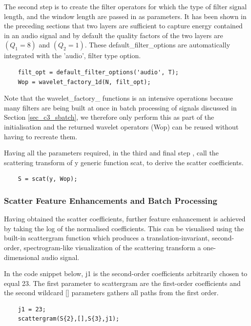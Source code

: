 The second step is to create the filter operators for which the type of filter signal length, and the window length are passed in as parameters.  It has been shown in the preceding sections that two layers are sufficient to capture energy contained in an audio signal and by default the quality factors of the two layers are $(Q_1 = 8)$ and $(Q_2 = 1)$. These default\_filter\_options are automatically integrated with the 'audio', filter type option.
\begin{verbatim}
    filt_opt = default_filter_options('audio', T);
    Wop = wavelet_factory_1d(N, filt_opt);
\end{verbatim}
Note that the wavelet\_factory\_ functions is an intensive operations because many filters are being built at once  in batch processing of signals discussed in Section \ref{sec_c3_sbatch}, we therefore only perform this as part of the initialisation and the returned wavelet operators (Wop) can be reused without having to recreate them.

Having all the parameters required, in the third and final step , call the scattering transform of y generic function scat, to derive the scatter coefficients.
\begin{verbatim}
    S = scat(y, Wop);
\end{verbatim}

\subsubsection{Scatter Feature Enhancements and Batch Processing}
Having obtained the scatter coefficients, further feature enhancement is achieved by taking the log of the normalised coefficients.  This can be visualised using the  built-in scattergram function which produces a translation-invariant, second-order, spectrogram-like visualization of the  scattering transform a one-dimensional audio signal. 

In the code snippet below, j1 is the second-order coefficients arbitrarily chosen to equal 23.  The first parameter to scattergram are the first-order coefficients and the second wildcard [] parameters gathers all paths from the first order.  
\begin{verbatim}
    j1 = 23;
    scattergram(S{2},[],S{3},j1);
\end{verbatim}

